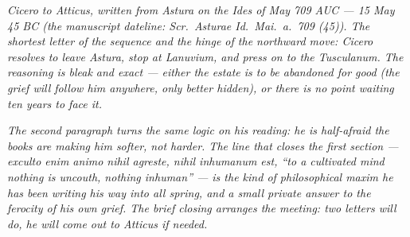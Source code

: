 
\textit{Cicero to Atticus, written from Astura on the
Ides of May 709 AUC --- 15 May 45 BC (the manuscript
dateline: \textit{Scr.\ Asturae Id.\ Mai.\ a.\ 709
(45)}). The shortest letter of the sequence and the
hinge of the northward move: Cicero resolves to leave
Astura, stop at Lanuvium, and press on to the
Tusculanum. The reasoning is bleak and exact ---
either the estate is to be abandoned for good (the
grief will follow him anywhere, only better hidden),
or there is no point waiting ten years to face it.}

\textit{The second paragraph turns the same logic on
his reading: he is half-afraid the books are making
him softer, not harder. The line that closes the
first section --- \textit{exculto enim animo nihil
agreste, nihil inhumanum est}, ``to a cultivated mind
nothing is uncouth, nothing inhuman'' --- is the kind
of philosophical maxim he has been writing his way
into all spring, and a small private answer to the
ferocity of his own grief. The brief closing arranges
the meeting: two letters will do, he will come out to
Atticus if needed.}
